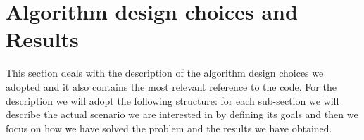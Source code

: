\section{Algorithm design choices and Results}
This section deals with the description of the algorithm design choices we adopted and it also contains the most relevant reference to the code.
For the description we will adopt the following structure: for each sub-section we will describe the actual scenario we are interested in by defining its goals and then we focus on how we have solved the problem and the results we have obtained.